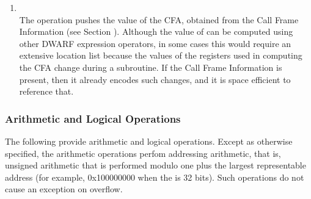 \begin{enumerate}[1]
\item {} \\
The  operation pushes the value of the
CFA, obtained from the Call Frame Information 
(see Section ).
Although the value of 
can be computed using other DWARF expression operators,
in some cases this would require an extensive location list
because the values of the registers used in computing the
CFA change during a subroutine. If the 
Call Frame Information 
is present, then it already encodes such changes, and it is
space efficient to reference that.
\end{enumerate}

\subsubsection{Arithmetic and Logical Operations}
The 
following 
provide arithmetic and logical operations. Except
as otherwise specified, the arithmetic operations perfom
addressing arithmetic, that is, unsigned arithmetic that is
performed modulo one plus the largest representable address
(for example, 0x100000000 when the 
 is 32
bits). 
Such operations do not cause an exception on overflow.

